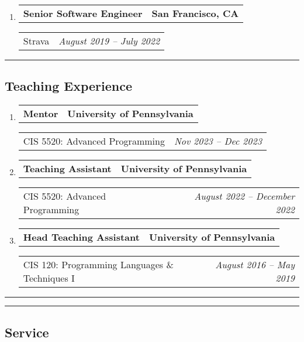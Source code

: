 \documentclass[letterpaper]{article}
\makeatletter
\newif\iflong
\newcommand*{\tabulardef}[3]{\begin{tabular}[t]{@{}lp{\dimexpr\linewidth-#1}@{}}
    #2&#3
\end{tabular}}
\newcommand{\headerrow}[2]
{\begin{tabular*}{\linewidth}{l@{\extracolsep{\fill}}r}
	#1 &
	#2 \\
\end{tabular*}}
\makeatother
\begin{document}
\begin{enumerate}[label=]
	\item
		\headerrow
			{\textbf{Senior Software Engineer}}
			{\textbf{San Francisco, CA}}
	\headerrow
		{Strava}
		{\emph{August 2019 -- July 2022}}
    \iflong
	\begin{enumerate}[label= *]
	\parskip=-0.1em
        \item Led the design and implementation of core system for modeling types of activities
        \item Mentored junior engineers in microservice architecture and Scala programming
        \item \tabulardef{4cm}{}{Used Apache Spark and Apache Kafka to build a geospatial data export tool for city planners}
		\item Built tools to verify and ensure correctness of internal route data
		\item Developed a Scala microservice serving all static maps in product
	\end{enumerate}
    \fi
\end{enumerate}

\hrule
\subsection*{Teaching Experience}
\begin{enumerate}[label=]
	\parskip=-0.05em
    \item
        \headerrow
            {\textbf{Mentor}}
            {\textbf{University of Pennsylvania}}
        \headerrow
            {CIS 5520: Advanced Programming}
            {\emph{Nov 2023 -- Dec 2023}}

	\item
		\headerrow
			{\textbf{Teaching Assistant}}
			{\textbf{University of Pennsylvania}}
	\headerrow
		{CIS 5520: Advanced Programming}
		{\emph{August 2022 -- December 2022}}

	\item
		\headerrow
			{\textbf{Head Teaching Assistant}}
			{\textbf{University of Pennsylvania}}
	\headerrow
		{CIS 120: Programming Languages \& Techniques I}
		{\emph{August 2016 -- May 2019}}
\end{enumerate}

\hrule

\newpage

\hrule
\subsection*{Service}
\end{document}
